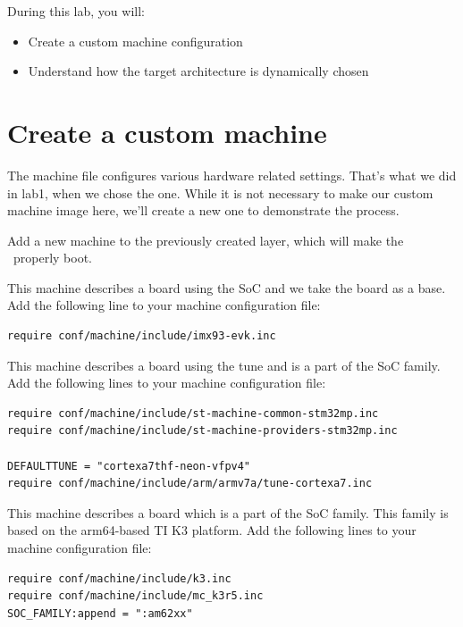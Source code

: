 
During this lab, you will:
\begin{itemize}
  \item Create a custom machine configuration
  \item Understand how the target architecture is dynamically chosen
\end{itemize}

\section{Create a custom machine}

The machine file configures various hardware related settings. That's
what we did in lab1, when we chose the \board{} one.
While it is not necessary to make our custom machine image here, we'll create a new one to demonstrate the process.

Add a new  machine to the previously created layer, which
will make the \board\ properly boot.

\if{}
This machine describes a board using the  SoC and we take the board
 as a base. Add the following line to your machine configuration file:
\begin{verbatim}
require conf/machine/include/imx93-evk.inc
\end{verbatim}
\fi

\if{}
This machine describes a board using the 
tune and is a part of the  SoC family. Add the following
lines to your machine configuration file:

\begin{verbatim}
require conf/machine/include/st-machine-common-stm32mp.inc
require conf/machine/include/st-machine-providers-stm32mp.inc

DEFAULTTUNE = "cortexa7thf-neon-vfpv4"
require conf/machine/include/arm/armv7a/tune-cortexa7.inc
\end{verbatim}
\fi

\if{}
This machine describes a board which is a part of the  SoC family.
This family is based on the arm64-based TI K3 platform.
Add the following lines to your machine configuration file:

\begin{verbatim}
require conf/machine/include/k3.inc
require conf/machine/include/mc_k3r5.inc
SOC_FAMILY:append = ":am62xx"
\end{verbatim}

